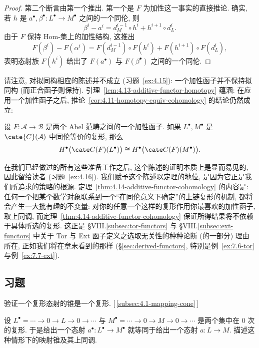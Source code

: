\begin{proof}
第二个断言由第一个推出. 第一个是 $F$ 为加性这一事实的直接推论. 确实, 若 $h$ 是 $a^\bullet,\beta^\bullet:L^\bullet\to M^\bullet$ 之间的一个同伦, 则
\[
\beta^i-a^i=d_M^{i-1}\circ h^i+h^{i+1}\circ d_L^i.
\]
由于 $F$ 保持 Hom-集上的加性结构, 这推出
\[
F(\beta^i)-F(\alpha^i)=F(d_M^{i-1})\circ F(h^i)+F(h^{i+1})\circ F(d_L^i),
\]
表明态射族 $F(h^i)$ 给出了 $F(a^\bullet)$ 与 $F(\beta^\bullet)$ 之间的一个同伦.
\end{proof}

\indent 请注意, 对拟同构相应的陈述并不成立 (习题~\ref{ex:4.15}): 一个加性函子并不保持拟同构 (而正合函子则保持).
引理~\ref{lem:4.13-additive-functor-homotopy} 蕴涵: 在应用一个加性函子之后, 推论~\ref{cor:4.11-homotopy-equiv-cohomology} 的结论仍然成立:

\begin{theorem}\label{thm:4.14-additive-functor-cohomology}
设 $F:\mathcal A\to\mathcal B$ 是两个 Abel 范畴之间的一个加性函子. 如果 $L^\bullet,M^\bullet$ 是 $\cate{C}(\mathcal A)$ 中同伦等价的复形, 那么
\[
H^\bullet\bigl(\cate C(F)(L^\bullet)\bigr)\cong
H^\bullet\bigl(\cate C(F)(M^\bullet)\bigr).
\]
\end{theorem}

\indent 在我们已经做过的所有这些准备工作之后, 这个陈述的证明本质上是显而易见的, 因此留给读者 (习题~\ref{ex:4.16}).
我们赋予这个陈述以定理的地位, 是因为它正是我们所追求的策略的根源. 定理~\ref{thm:4.14-additive-functor-cohomology} 的内容是: 任何一个把某个数学对象联系到一个``在同伦意义下确定''的上链复形的机制, 都将会产生一大批有趣的不变量: 对你的任意一个这样的复形作用你最喜欢的加性函子, 取上同调, 而定理~\ref{thm:4.14-additive-functor-cohomology} 保证所得结果将不依赖于具体所选的复形. 这正是 §VIII.\ref{subsec:tor-functors} 与 §VIII.\ref{subsec:ext-functors} 中关于 Tor 与 Ext 函子定义之选取无关性的种种论断 (的一部分) 理由所在, 正如我们将在章末看到的那样 (\S\ref{sec:derived-functors}, 特别是例~\ref{ex:7.6-tor} 与例~\ref{ex:7.7-ext}).

\subsection*{习题}
{}

\begin{prob}\label{ex:4.1}
验证一个复形态射的锥是一个复形. [\,\ref{subsec:4.1-mapping-cone}\,]
\end{prob}

\begin{prob}\label{ex:4.2}
设 $L^\bullet=\cdots\to 0\to L\to 0\to\cdots$ 与 $M^\bullet=\cdots\to 0\to M\to 0\to\cdots$ 是两个集中在 0 次的复形. 于是给出一个态射 $a^\bullet:L^\bullet\to M^\bullet$ 就等同于给出一个态射 $a:L\to M$. 描述这种情形下的映射锥及其上同调.
\end{prob}

